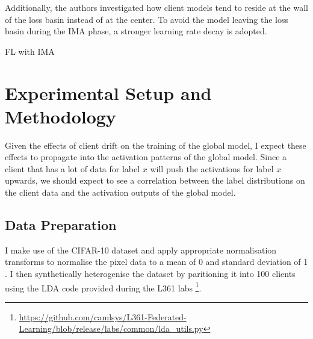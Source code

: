 \documentclass{article}
\begin{document}
Additionally, the authors investigated how client models tend to reside at the wall of the loss basin instead of at the center. To avoid the model leaving the loss basin during the IMA phase, a stronger learning rate decay is adopted.

\begin{algorithm}
  \caption{FL with IMA}\label{alg:IMA}
\end{algorithm}


\section{Experimental Setup and Methodology}
Given the effects of client drift on the training of the global model, I expect these effects to propagate into the activation patterns of the global model. Since a client that has a lot of data for label $x$ will push the activations for label $x$ upwards, we should expect to see a correlation between the label distributions on the client data and the activation outputs of the global model.

\subsection{Data Preparation}
I make use of the CIFAR-10 dataset \cite{krizhevskyLearningMultipleLayers2009} and apply appropriate normalisation transforms to normalise the pixel data to a mean of 0 and standard deviation of 1 \cite{ValueMeanStd2017}. I then synthetically heterogenise the dataset by paritioning it into 100 clients using the LDA code provided during the L361 labs \footnote{\tiny\url{https://github.com/camlsys/L361-Federated-Learning/blob/release/labs/common/lda_utils.py}}.
\end{document}
